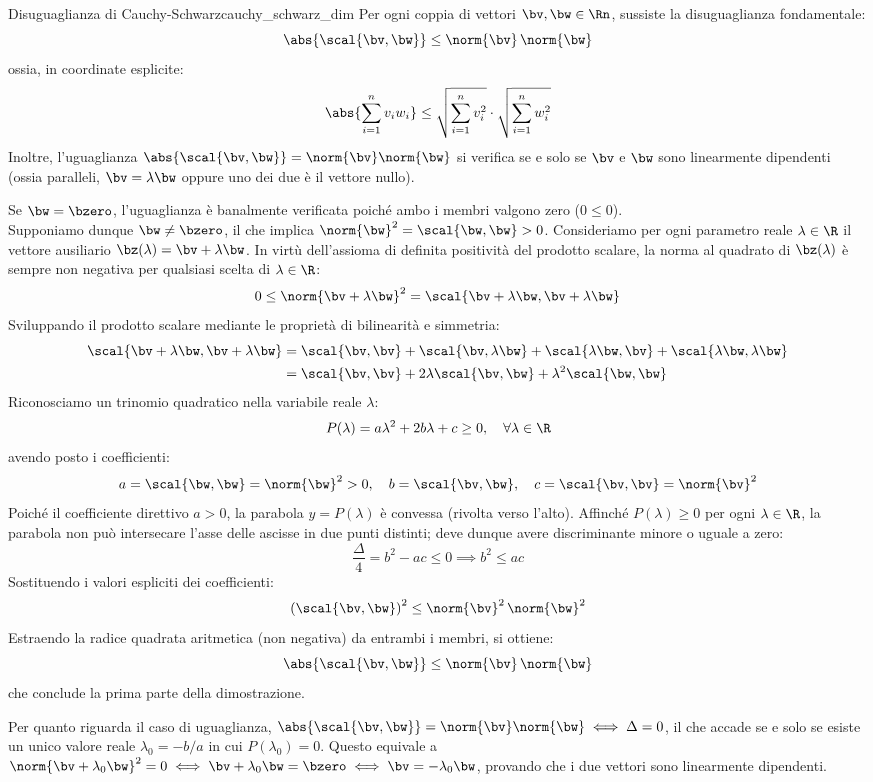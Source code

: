 \begin{teorema}{Disuguaglianza di Cauchy-Schwarz}{cauchy_schwarz_dim}
Per ogni coppia di vettori $\bv, \bw \in \Rn$, sussiste la disuguaglianza fondamentale:
\[
\abs{\scal{\bv, \bw}} \le \norm{\bv} \, \norm{\bw}
\]
ossia, in coordinate esplicite:
\[
\abs{\sum_{i=1}^n v_i w_i} \le \sqrt{\sum_{i=1}^n v_i^2} \cdot \sqrt{\sum_{i=1}^n w_i^2}
\]
Inoltre, l'uguaglianza $\abs{\scal{\bv, \bw}} = \norm{\bv} \norm{\bw}$ si verifica se e solo se $\bv$ e $\bw$ sono linearmente dipendenti (ossia paralleli, $\bv = \lambda \bw$ oppure uno dei due è il vettore nullo).
\end{teorema}

\begin{dimostrazione}
Se $\bw = \bzero$, l'uguaglianza è banalmente verificata poiché ambo i membri valgono zero ($0 \le 0$).\\
Supponiamo dunque $\bw \neq \bzero$, il che implica $\norm{\bw}^2 = \scal{\bw, \bw} > 0$. Consideriamo per ogni parametro reale $\lambda \in \R$ il vettore ausiliario $\bz(\lambda) = \bv + \lambda \bw$. In virtù dell'assioma di definita positività del prodotto scalare, la norma al quadrato di $\bz(\lambda)$ è sempre non negativa per qualsiasi scelta di $\lambda \in \R$:
\[
0 \le \norm{\bv + \lambda \bw}^2 = \scal{\bv + \lambda \bw, \bv + \lambda \bw}
\]
Sviluppando il prodotto scalare mediante le proprietà di bilinearità e simmetria:
\begin{align*}
\scal{\bv + \lambda \bw, \bv + \lambda \bw} &= \scal{\bv, \bv} + \scal{\bv, \lambda \bw} + \scal{\lambda \bw, \bv} + \scal{\lambda \bw, \lambda \bw} \\
&= \scal{\bv, \bv} + 2\lambda\scal{\bv, \bw} + \lambda^2\scal{\bw, \bw}
\end{align*}
Riconosciamo un trinomio quadratico nella variabile reale $\lambda$:
\[
P(\lambda) = a \lambda^2 + 2b \lambda + c \ge 0, \quad \forall \lambda \in \R
\]
avendo posto i coefficienti:
\[
a = \scal{\bw, \bw} = \norm{\bw}^2 > 0, \quad b = \scal{\bv, \bw}, \quad c = \scal{\bv, \bv} = \norm{\bv}^2
\]
Poiché il coefficiente direttivo $a > 0$, la parabola $y = P(\lambda)$ è convessa (rivolta verso l'alto). Affinché $P(\lambda) \ge 0$ per ogni $\lambda \in \R$, la parabola non può intersecare l'asse delle ascisse in due punti distinti; deve dunque avere discriminante minore o uguale a zero:
\[
\frac{\Delta}{4} = b^2 - ac \le 0 \implies b^2 \le ac
\]
Sostituendo i valori espliciti dei coefficienti:
\[
\left( \scal{\bv, \bw} \right)^2 \le \norm{\bv}^2 \, \norm{\bw}^2
\]
Estraendo la radice quadrata aritmetica (non negativa) da entrambi i membri, si ottiene:
\[
\abs{\scal{\bv, \bw}} \le \norm{\bv} \, \norm{\bw}
\]
che conclude la prima parte della dimostrazione.

Per quanto riguarda il caso di uguaglianza, $\abs{\scal{\bv, \bw}} = \norm{\bv}\norm{\bw} \iff \Delta = 0$, il che accade se e solo se esiste un unico valore reale $\lambda_0 = -b/a$ in cui $P(\lambda_0) = 0$. Questo equivale a $\norm{\bv + \lambda_0 \bw}^2 = 0 \iff \bv + \lambda_0 \bw = \bzero \iff \bv = -\lambda_0 \bw$, provando che i due vettori sono linearmente dipendenti.
\end{dimostrazione}

